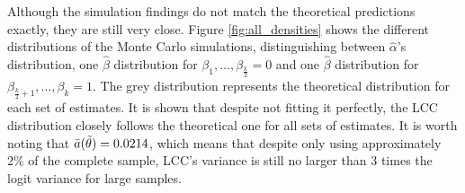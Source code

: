 Although the simulation findings do not match the theoretical predictions exactly, they are still very close. Figure \ref{fig:all_densities} shows the different distributions of the Monte Carlo simulations, distinguishing between $\hat{\alpha}$'s distribution, one $\hat{\beta}$ distribution for $\beta_1, \dots, \beta_{\frac{k}{2}}=0$ and one $\hat{\beta}$ distribution for $\beta_{\frac{k}{2}+1}, \dots, \beta_k=1$. The grey distribution represents the theoretical distribution for each set of estimates. It is shown that despite not fitting it perfectly, the LCC distribution closely follows the theoretical one for all sets of estimates. It is worth noting that $\Bar{a}(\Tilde{\theta})=0.0214$, which means that despite only using approximately $2\%$ of the complete sample, LCC's variance is still no larger than $3$ times the logit variance for large samples.


